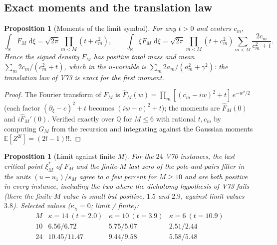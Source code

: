\documentclass[11pt]{article}
\newtheorem{proposition}[theorem]{Proposition}
\theoremstyle{definition}
\theoremstyle{remark}
\newcommand{\dd}{\,\mathrm d}
\begin{document}
\subsection{Exact moments and the translation law}

\begin{proposition}[Moments of the limit symbol]
\label{prop:f2v74-moments}
For any \(t>0\) and centers \(c_m\),
\begin{equation}
 \int_{\mathbb R}F_M\,\dd\xi=\sqrt{2\pi}\prod_{m<M}(t+c_m^2),\qquad
 \int_{\mathbb R}\xi F_M\,\dd\xi=\sqrt{2\pi}\prod_{m<M}(t+c_m^2)\sum_{m<M}\frac{2c_m}{c_m^2+t}.
 \label{eq:f2v74-moments}
\end{equation}
Hence the signed density \(F_M\) has positive total mass and mean
\(\sum_m2c_m/(c_m^2+t)\), which in the \(u\)-variable is
\(\sum_m2a_m/(a_m^2+\gamma^2)\): the translation law of V73 is exact for
the first moment.
\end{proposition}

\begin{proof}
The Fourier transform of \(F_M\) is
\(\widehat F_M(w)=\prod_m[(c_m-iw)^2+t]\,e^{-w^2/2}\) (each factor
\((\partial_\xi-c)^2+t\) becomes \((iw-c)^2+t\)); the moments are
\(\widehat F_M(0)\) and \(i\widehat F_M'(0)\).  Verified exactly over
\(\mathbb Q\) for \(M\le6\) with rational \(t,c_m\) by computing \(G_M\)
from the recursion and integrating against the Gaussian moments
\(\mathbb E[Z^{2l}]=(2l-1)!!\).
\end{proof}

\begin{proposition}[Limit against finite \(M\)]
\label{prop:f2v74-numerics}
For the \(24\) V70 instances, the last critical point \(\xi^*_M\) of
\(F_M\) and the finite-\(M\) last zero of the pole-and-pairs filter in
the units \((u-u_1)/s_M\) agree to a few percent for \(M\ge10\) and are
both positive in every instance, including the two where the dichotomy
hypothesis of V73 fails (there the finite-\(M\) value is small but
positive, \(1.5\) and \(2.9\), against limit values \(3.8\)).  Selected
values (\(\kappa_\chi=0\); limit / finite):
\begin{equation}
\begin{array}{c|ccc}
 M & \kappa=14\ (t=2.0) & \kappa=10\ (t=3.9) & \kappa=6\ (t=10.9)\\ \hline
 10 & 6.56/6.72 & 5.75/5.07 & 2.51/2.44\\
 24 & 10.45/11.47 & 9.44/9.58 & 5.58/5.48
\end{array}
\label{eq:f2v74-table}
\end{equation}
\end{proposition}
\end{document}
